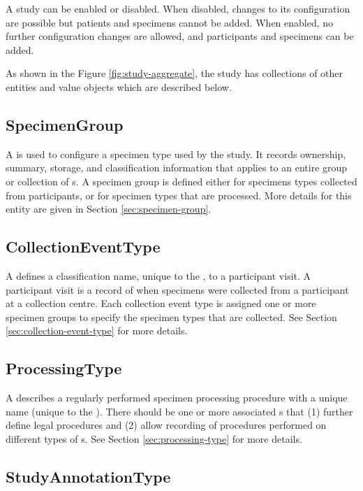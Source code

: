 A study can be enabled or disabled. When disabled, changes to its configuration
are possible but patients and specimens cannot be added. When enabled, no
further configuration changes are allowed, and participants and specimens can
be added.

As shown in the Figure \ref{fig:study-aggregate}, the study has collections of
other entities and value objects which are described below.

\subsection*{SpecimenGroup}

A  is used to configure a specimen type used by the
study.  It records ownership, summary, storage, and classification information
that applies to an entire group or collection of s. A
specimen group is defined either for specimens types collected from
participants, or for specimen types that are processed. More details for this
entity are given in Section \ref{sec:specimen-group}.

\subsection*{CollectionEventType}
A  defines a classification name, unique to
the , to a participant visit. A participant visit is a record
of when specimens were collected from a participant at a collection
centre. Each collection event type is assigned one or more specimen groups to
specify the specimen types that are collected. See Section
\ref{sec:collection-event-type} for more details.

\subsection*{ProcessingType}
A  describes a regularly performed specimen
processing procedure with a unique name (unique to the
). There should be one or more associated
s that (1) further define legal procedures and (2)
allow recording of procedures performed on different types of
s. See Section \ref{sec:processing-type} for more details.

\subsection*{StudyAnnotationType}

